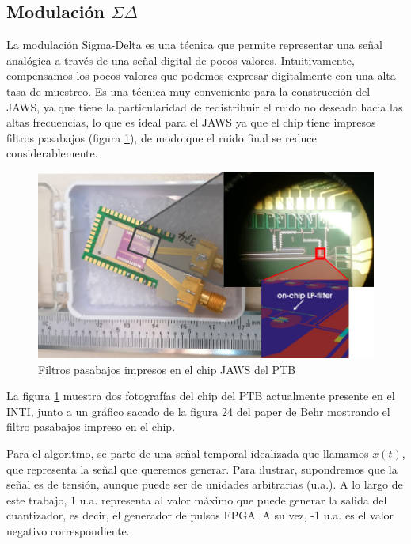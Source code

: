 \documentclass[twoside]{article}
\begin{document}
\begin{multicols}{2}




\subsection{Modulación $\Sigma\Delta$}

La modulación Sigma-Delta \cite{delarosa2011} \cite{aziz1996} es una técnica que permite representar una señal analógica a través de una señal digital de pocos valores. Intuitivamente, compensamos los pocos valores que podemos expresar digitalmente con una alta tasa de muestreo. Es una técnica muy conveniente para la construcción del JAWS, ya que tiene la particularidad de redistribuir el ruido no deseado hacia las altas frecuencias, lo que es ideal para el JAWS ya que el chip tiene impresos filtros pasabajos (figura \ref{fig:LPF}), de modo que el ruido final se reduce considerablemente.

\begin{figure}[H]
\centering
\includegraphics[width=\linewidth]{figuras/filtroLP.png}
\caption{Filtros pasabajos impresos en el chip JAWS del PTB}
\label{fig:LPF}
\end{figure}

La figura \ref{fig:LPF} muestra dos fotografías del chip del PTB actualmente presente en el INTI, junto a un gráfico sacado de la figura 24 del paper de Behr \cite{behr2012} mostrando el filtro pasabajos impreso en el chip.


Para el algoritmo, se parte de una señal temporal idealizada que llamamos $x(t)$, que representa la señal que queremos generar. Para ilustrar, supondremos que la señal es de tensión, aunque puede ser de unidades arbitrarias (u.a.). A lo largo de este trabajo, 1 u.a. representa al valor máximo que puede generar la salida del cuantizador, es decir, el generador de pulsos FPGA. A su vez, -1 u.a. es el valor negativo correspondiente.


\end{multicols}
\end{document}
